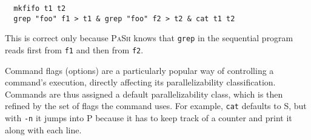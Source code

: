 \documentclass[sigplan, review, screen, anonymous]{acmart}
\newcommand{\heading}[1]{\vspace{4pt}\noindent\textbf{#1}\enspace}
\newcommand{\ttt}[1]{\texttt{#1}}
\newcommand{\cn}[1]{\mbox{\textcircled{\footnotesize #1}}}
\newcommand{\sta}{\cn{\textsc{S}}\xspace}
\newcommand{\pur}{\cn{\textsc{P}}\xspace}
\newcommand{\sid}{\cn{\textsc{E}}\xspace}
\newcommand{\sx}[1]{(\S\ref{#1})}
\newcommand{\sys}{{\scshape PaSh}\xspace}
\begin{document}
\begin{verbatim}
  mkfifo t1 t2
  grep "foo" f1 > t1 & grep "foo" f2 > t2 & cat t1 t2
\end{verbatim}

\noindent
This is correct only because \sys knows that \ttt{grep} in the sequential program reads first from \ttt{f1} and then from \ttt{f2}.

Command flags (options) are a particularly popular way of controlling a command's execution, directly affecting its parallelizability classification.
Commands are thus assigned a default parallelizability class, which is then refined by the set of flags the command uses.
For example, \ttt{cat} defaults to \sta, but with \ttt{-n} it jumps into \pur because it has to keep track of a counter and print it along with each line.






\end{document}
